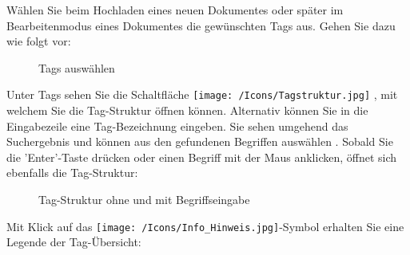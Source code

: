 \vspace{\baselineskip}

Wählen Sie beim Hochladen eines neuen Dokumentes oder später im Bearbeitenmodus eines Dokumentes die gewünschten Tags aus. Gehen Sie dazu wie folgt vor: 

\begin{figure}[H]
\caption{Tags auswählen}
\end{figure}

Unter Tags  sehen Sie die Schaltfläche \texttt{[image: /Icons/Tagstruktur.jpg]} , mit welchem Sie die Tag-Struktur öffnen können. Alternativ können Sie in die Eingabezeile  eine Tag-Bezeichnung eingeben. Sie sehen umgehend das Suchergebnis und können aus den gefundenen Begriffen auswählen . Sobald Sie die 'Enter'-Taste drücken oder einen Begriff mit der Maus anklicken, öffnet sich ebenfalls die Tag-Struktur:

\begin{figure}[H]
\caption{Tag-Struktur ohne und mit Begriffseingabe}
\end{figure}

Mit Klick auf das \texttt{[image: /Icons/Info\_Hinweis.jpg]}-Symbol  erhalten Sie eine Legende der Tag-Übersicht:

